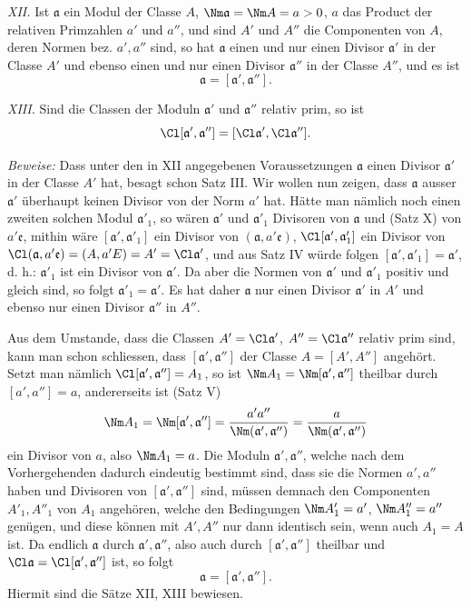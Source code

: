 \emph{XII.} Ist $\mathfrak a$ ein Modul der Classe $A$, $\Nm\mathfrak a=\Nm A=a>0$, $a$ das Product der relativen Primzahlen $a'$ und $a''$, und sind $A'$ und $A''$ die Componenten von $A$, deren Normen bez. $a',a''$ sind, so hat $\mathfrak a$ einen und nur einen Divisor $\mathfrak a'$ in der Classe $A'$ und ebenso einen und nur einen Divisor $\mathfrak a''$ in der Classe $A''$, und es ist
\[
 \mathfrak a=[\mathfrak a',\mathfrak a''].
\]

\emph{XIII.} Sind die Classen der Moduln $\mathfrak a'$ und $\mathfrak a''$ relativ prim, so ist
\[
 \Cl[\mathfrak a',\mathfrak a'']=[\Cl\mathfrak a',\Cl\mathfrak a''].
\]

\emph{Beweise:} Dass unter den in XII angegebenen Voraussetzungen $\mathfrak a$ einen Divisor $\mathfrak a'$ in der Classe $A'$ hat, besagt schon Satz III. Wir wollen nun zeigen, dass $\mathfrak a$ ausser $\mathfrak a'$ überhaupt keinen Divisor von der Norm $a'$ hat. Hätte man nämlich noch einen zweiten solchen Modul $\mathfrak a'_1$, so wären $\mathfrak a'$ und $\mathfrak a'_1$ Divisoren von $\mathfrak a$ und (Satz X) von $a'\mathfrak e$, mithin wäre $[\mathfrak a',\mathfrak a'_1]$ ein Divisor von $(\mathfrak a,a'\mathfrak e)$, $\Cl[\mathfrak a',\mathfrak a'_1]$ ein Divisor von $\Cl(\mathfrak a,a'\mathfrak e)=(A,a'E)=A'=\Cl\mathfrak a'$, und aus Satz IV würde folgen $[\mathfrak a',\mathfrak a'_1]=\mathfrak a'$, d. h.: $\mathfrak a'_1$ ist ein Divisor von $\mathfrak a'$. Da aber die Normen von $\mathfrak a'$ und $\mathfrak a'_1$ positiv und gleich sind, so folgt $\mathfrak a'_1=\mathfrak a'$. Es hat daher $\mathfrak a$ nur einen Divisor $\mathfrak a'$ in $A'$ und ebenso nur einen Divisor $\mathfrak a''$ in $A''$.

Aus dem Umstande, dass die Classen $A'=\Cl\mathfrak a'$, $A''=\Cl\mathfrak a''$ relativ prim sind, kann man schon schliessen, dass $[\mathfrak a',\mathfrak a'']$ der Classe $A=[A',A'']$ angehört. Setzt man nämlich $\Cl[\mathfrak a',\mathfrak a'']=A_1$, so ist $\Nm A_1=\Nm[\mathfrak a',\mathfrak a'']$ theilbar durch $[a',a'']=a$, andererseits ist (Satz V)
\[
 \Nm A_1=\Nm[\mathfrak a',\mathfrak a'']
 ={a'a''\over \Nm(\mathfrak a',\mathfrak a'')}
 ={a\over \Nm(\mathfrak a',\mathfrak a'')}
\]
ein Divisor von $a$, also $\Nm A_1=a$. Die Moduln $\mathfrak a',\mathfrak a''$, welche nach dem Vorhergehenden dadurch eindeutig bestimmt sind, dass sie die Normen $a',a''$ haben und Divisoren von $[\mathfrak a',\mathfrak a'']$ sind, müssen demnach den Componenten $A'_1,A''_1$ von $A_1$ angehören, welche den Bedingungen $\Nm A'_1=a'$, $\Nm A''_1=a''$ genügen, und diese können mit $A',A''$ nur dann identisch sein, wenn auch $A_1=A$ ist. Da endlich $\mathfrak a$ durch $\mathfrak a',\mathfrak a''$, also auch durch $[\mathfrak a',\mathfrak a'']$ theilbar und $\Cl\mathfrak a=\Cl[\mathfrak a',\mathfrak a'']$ ist, so folgt
\[
 \mathfrak a=[\mathfrak a',\mathfrak a''].
\]
Hiermit sind die Sätze XII, XIII bewiesen.

